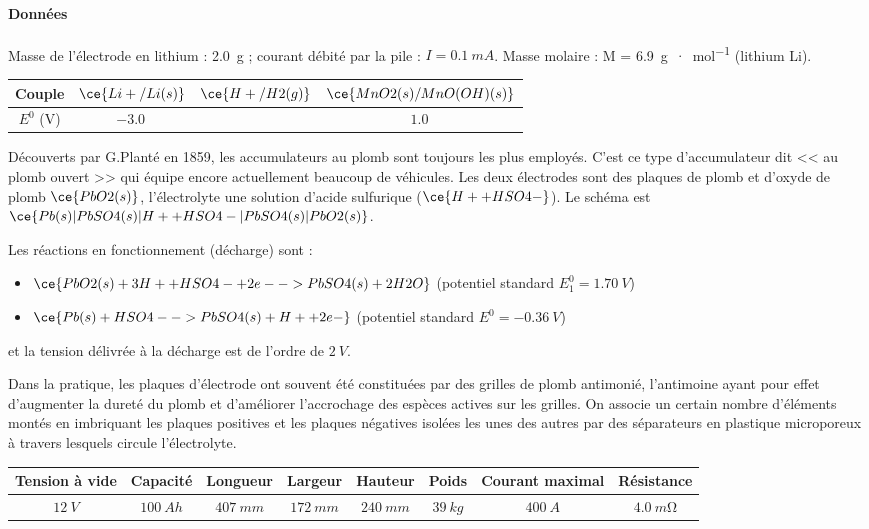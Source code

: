     \paragraph{Données} Masse de l’électrode en lithium : \SI{2,0}{g} ; courant débité par la pile : $I = \SI{0,1}{mA}$. Masse molaire : M = \SI{6,9}{g·mol^{-1}} (lithium Li).
    \begin{table}[!ht]
      \centering
      \begin{tabular}{|c|c|c|c|}
        \hline
        Couple & $\ce{Li+/Li(s)}$ & $\ce{H+/H2(g)}$ & $\ce{MnO2(s)/MnO(OH)(s)}$\\
        \hline
        $E^0$ (V) & $\SI{-3.0}{}$ & & $\SI{1.0}{}$\\
        \hline
      \end{tabular}
    \end{table}
    
    Découverts par G.Planté en 1859, les accumulateurs au plomb sont toujours les plus employés. C’est ce type d’accumulateur dit << au plomb ouvert >> qui équipe encore actuellement beaucoup de véhicules.  Les  deux  électrodes  sont  des  plaques  de  plomb  et  d’oxyde  de  plomb  $\ce{PbO2(s)}$, l’électrolyte  une  solution  d’acide  sulfurique ($\ce{H+ + HSO4-}$). Le schéma est $\ce{Pb(s) | PbSO4(s) | H+ + HSO4- | PbSO4(s) | PbO2(s)}$.
      
    Les réactions en fonctionnement (décharge) sont : 
    \begin{itemize}
    \item $\ce{PbO2(s) + 3H+ + HSO4- + 2e- -> PbSO4(s) + 2 H2O}$ (potentiel standard $E^0_1 = \SI{1.70}{V}$)
    \item $\ce{Pb(s) + HSO4- -> PbSO4(s) + H+ + 2e-}$ (potentiel standard $E^0=\SI{-0.36}{V}$)
    \end{itemize}
    et la tension délivrée à la décharge est de l’ordre de $\SI{2}{V}$. 
    
    Dans la pratique, les plaques d’électrode ont souvent été constituées par des grilles de plomb antimonié, l’antimoine ayant pour effet  d’augmenter  la  dureté  du  plomb  et  d’améliorer  l’accrochage  des  espèces  actives  sur  les  grilles. On  associe  un  certain nombre  d’éléments  montés  en  imbriquant  les  plaques positives  et  les  plaques  négatives  isolées  les  unes  des  autres  par  des séparateurs en plastique microporeux à travers lesquels circule l’électrolyte. 
      
    \begin{table}[!ht]
      \centering
      \begin{tabular}{|c|c|c|c|c|c|c|c|}
        \hline
        Tension à vide & Capacité & Longueur & Largeur & Hauteur & Poids & Courant maximal & Résistance\\
        \hline
        $\SI{12}{V}$ & $\SI{100}{Ah}$ & $\SI{407}{mm}$ & $\SI{172}{mm}$ & $\SI{240}{mm}$ & $\SI{39}{kg}$ & $\SI{400}{A}$ & $\SI{4.0}{m\ohm}$\\
        \hline
      \end{tabular}
    \end{table}
     
